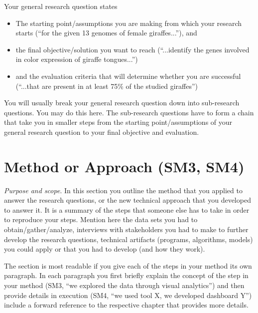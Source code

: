 \documentclass[
  fontsize=10pt
  numbers=noenddot,
  english,  %
  paper=a5,
  twoside,  %
  DIV=calc,
  headings=small,
  bibliography=totoc,
  listof=totoc,
  draft=false
]{scrbook}
\theoremstyle{break}
\begin{document}
Your general research question states
\begin{itemize}
    \item The starting point/assumptions you are making from which your research starts (``for the given 13 genomes of female giraffes...''), and
    \item the final objective/solution you want to reach (``...identify the genes involved in color expression of giraffe tongues...'')
    \item and the evaluation criteria that will determine whether you are successful (``...that are present in at least 75\% of the studied giraffes'')
\end{itemize}

You will usually break your general research question down into sub-research questions. You may do this here. The sub-research questions have to form a chain that take you in smaller steps from the starting point/assumptions of your general research question to your final objective and evaluation.

\section{Method or Approach (SM3, SM4)}\label{sec:introduction:method}

\emph{Purpose and scope}. In this section you outline the method that you applied to answer the research questions, or the new technical approach that you developed to answer it. It is a summary of the steps that someone else has to take in order to reproduce your steps. Mention here the data sets you had to obtain/gather/analyze, interviews with stakeholders you had to make to further develop the research questions, technical artifacts (programs, algorithms, models) you could apply or that you had to develop (and how they work).

The section is most readable if you give each of the steps in your method its own paragraph. In each paragraph you first briefly explain the concept of the step in your method (SM3, ``we explored the data through visual analytics'') and then provide details in execution (SM4, ``we used tool X, we developed dashboard Y'') include a forward reference to the respective chapter that provides more details.

\end{document}
